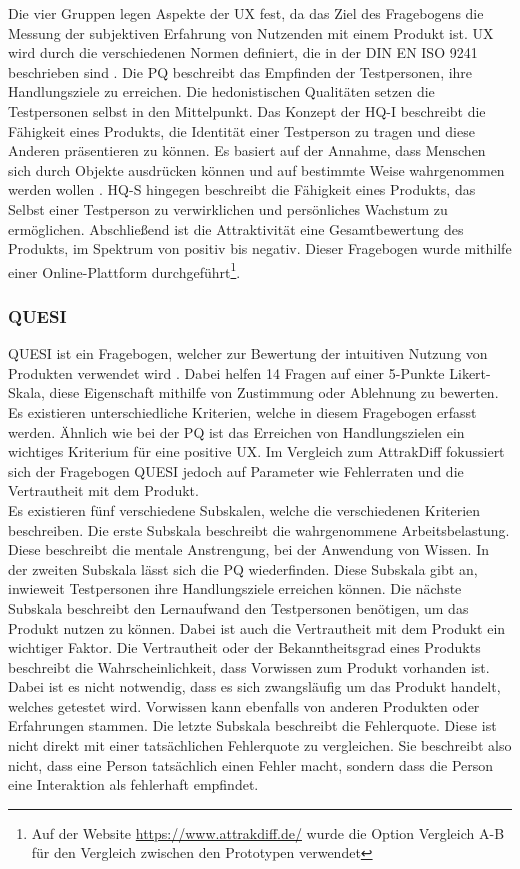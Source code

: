 Die vier Gruppen legen Aspekte der \ac{UX} fest, da das Ziel des Fragebogens die Messung der subjektiven Erfahrung von Nutzenden mit einem Produkt ist.
\ac{UX} wird durch die verschiedenen Normen definiert, die in der DIN EN ISO 9241 beschrieben sind \cite{iso9241}.
Die \ac{PQ} beschreibt das Empfinden der Testpersonen, ihre Handlungsziele zu erreichen.
Die hedonistischen Qualitäten setzen die Testpersonen selbst in den Mittelpunkt.
Das Konzept der \ac{HQ-I} beschreibt die Fähigkeit eines Produkts, die Identität einer Testperson zu tragen und diese Anderen präsentieren zu können.
Es basiert auf der Annahme, dass Menschen sich durch Objekte ausdrücken können und auf bestimmte Weise wahrgenommen werden wollen \cite{prentice}.
\ac{HQ-S} hingegen beschreibt die Fähigkeit eines Produkts, das Selbst einer Testperson zu verwirklichen und persönliches Wachstum zu ermöglichen.
Abschließend ist die Attraktivität eine Gesamtbewertung des Produkts, im Spektrum von positiv bis negativ.
Dieser Fragebogen wurde mithilfe einer Online-Plattform durchgeführt\footnote{Auf der Website \url{https://www.attrakdiff.de/} wurde die Option \glqq Vergleich A-B\grqq{} für den Vergleich zwischen den Prototypen verwendet}.

\subsubsection{QUESI}
\ac{QUESI} ist ein Fragebogen, welcher zur Bewertung der intuitiven Nutzung von Produkten verwendet wird \cite{quesi-benchmarks, quesi-short}.
Dabei helfen 14 Fragen auf einer 5-Punkte Likert-Skala, diese Eigenschaft mithilfe von Zustimmung oder Ablehnung zu bewerten.
Es existieren unterschiedliche Kriterien, welche in diesem Fragebogen erfasst werden.
Ähnlich wie bei der \ac{PQ} ist das Erreichen von Handlungszielen ein wichtiges Kriterium für eine positive \ac{UX}.
Im Vergleich zum AttrakDiff fokussiert sich der Fragebogen \ac{QUESI} jedoch auf Parameter wie Fehlerraten und die Vertrautheit mit dem Produkt.\\

Es existieren fünf verschiedene Subskalen, welche die verschiedenen Kriterien beschreiben.
Die erste Subskala beschreibt die wahrgenommene Arbeitsbelastung.
Diese beschreibt die mentale Anstrengung, bei der Anwendung von Wissen.
In der zweiten Subskala lässt sich die \ac{PQ} wiederfinden.
Diese Subskala gibt an, inwieweit Testpersonen ihre Handlungsziele erreichen können.
Die nächste Subskala beschreibt den Lernaufwand den Testpersonen benötigen, um das Produkt nutzen zu können.
Dabei ist auch die Vertrautheit mit dem Produkt ein wichtiger Faktor.
Die Vertrautheit oder der Bekanntheitsgrad eines Produkts beschreibt die Wahrscheinlichkeit, dass Vorwissen zum Produkt vorhanden ist.
Dabei ist es nicht notwendig, dass es sich zwangsläufig um das Produkt handelt, welches getestet wird.
Vorwissen kann ebenfalls von anderen Produkten oder Erfahrungen stammen.
Die letzte Subskala beschreibt die Fehlerquote.
Diese ist nicht direkt mit einer tatsächlichen Fehlerquote zu vergleichen.
Sie beschreibt also nicht, dass eine Person tatsächlich einen Fehler macht, sondern dass die Person eine Interaktion als fehlerhaft empfindet.

